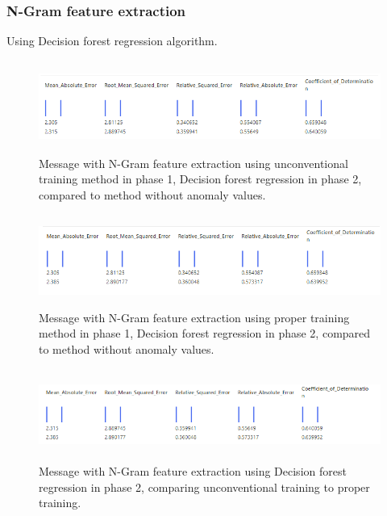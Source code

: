 

\subsubsection*{N-Gram feature extraction}
Using Decision forest regression algorithm.
\\
\begin{figure}[htb]
    \centering
    \includegraphics[height=30mm,scale=0.5]{./appendices/msg_ngram_decision-forest-reg_lewd2unanom.png}
    \caption{Message with N-Gram feature extraction
    using unconventional training method in phase 1,
        Decision forest regression in phase 2,
        compared to method without anomaly values.
        \label{fig:msg_ngram_decision-forest-reg_lewd2unanom}}
\end{figure}

\begin{figure}[htb]
    \centering
    \includegraphics[height=30mm,scale=0.5]{./appendices/msg_ngram_decision-forest-reg_proper2unanom.png}
    \caption{Message with N-Gram feature extraction
    using proper training method in phase 1,
        Decision forest regression in phase 2,
        compared to method without anomaly values.
        \label{fig:msg_ngram_decision-forest-reg_proper2unanom}}
\end{figure}

\begin{figure}[htb]
    \centering
    \includegraphics[height=30mm,scale=0.5]{./appendices/msg_ngram_decision-forest-reg_lewd2proper.png}
    \caption{Message with N-Gram feature extraction
    using Decision forest regression in phase 2,
        comparing unconventional training to proper training.
        \label{fig:msg_ngram_decision-forest-reg_lewd2proper}}
\end{figure}



